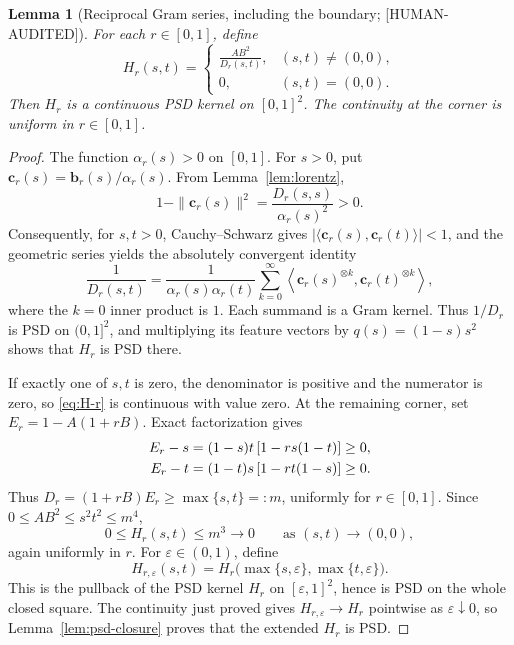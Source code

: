 \documentclass[11pt]{article}
\theoremstyle{plain}
\newtheorem{lemma}[theorem]{Lemma}
\theoremstyle{definition}
\theoremstyle{remark}
\newcommand{\status}[1]{\textnormal{\textsf{\footnotesize[#1]}}}
\newcommand{\HumanAudited}{\status{HUMAN-AUDITED}}
\begin{document}
\begin{lemma}[Reciprocal Gram series, including the boundary;
\HumanAudited]
\label{lem:reciprocal}
For each \(r\in[0,1]\), define
\begin{equation}
  H_r(s,t)=
  \begin{cases}
    \displaystyle\frac{AB^2}{D_r(s,t)},&(s,t)\ne(0,0),\\[6pt]
    0,&(s,t)=(0,0).
  \end{cases}
  \label{eq:H-r}
\end{equation}
Then \(H_r\) is a continuous PSD kernel on \([0,1]^2\).  The continuity at
the corner is uniform in \(r\in[0,1]\).
\end{lemma}

\begin{proof}
The function \(\alpha_r(s)>0\) on \([0,1]\).  For \(s>0\), put
\(\boldsymbol c_r(s)=\boldsymbol b_r(s)/\alpha_r(s)\).  From
Lemma~\ref{lem:lorentz},
\[
  1-\|\boldsymbol c_r(s)\|^2
  =\frac{D_r(s,s)}{\alpha_r(s)^2}>0.
\]
Consequently, for \(s,t>0\), Cauchy--Schwarz gives
\(|\langle\boldsymbol c_r(s),\boldsymbol c_r(t)\rangle|<1\), and the geometric
series yields the absolutely convergent identity
\begin{equation}
  \frac1{D_r(s,t)}
  =\frac1{\alpha_r(s)\alpha_r(t)}
   \sum_{k=0}^{\infty}
   \left\langle
     \boldsymbol c_r(s)^{\otimes k},
     \boldsymbol c_r(t)^{\otimes k}
   \right\rangle,
  \label{eq:reciprocal-series}
\end{equation}
where the \(k=0\) inner product is \(1\).  Each summand is a Gram kernel.
Thus \(1/D_r\) is PSD on \((0,1]^2\), and multiplying its feature vectors by
\(q(s)=(1-s)s^2\) shows that \(H_r\) is PSD there.

If exactly one of \(s,t\) is zero, the denominator is positive and the
numerator is zero, so \eqref{eq:H-r} is continuous with value zero.  At the
remaining corner, set \(E_r=1-A(1+rB)\).  Exact factorization gives
\begin{align}
  E_r-s&=(1-s)t\,[1-rs(1-t)]\ge0,\notag\\
  E_r-t&=(1-t)s\,[1-rt(1-s)]\ge0.
  \label{eq:corner-factors}
\end{align}
Thus \(D_r=(1+rB)E_r\ge\max\{s,t\}=:m\), uniformly for
\(r\in[0,1]\).  Since \(0\le AB^2\le s^2t^2\le m^4\),
\[
  0\le H_r(s,t)\le m^3\longrightarrow0
  \qquad\text{as }(s,t)\to(0,0),
\]
again uniformly in \(r\).  For \(\varepsilon\in(0,1)\), define
\[
H_{r,\varepsilon}(s,t)
=H_r\bigl(\max\{s,\varepsilon\},\max\{t,\varepsilon\}\bigr).
\]
This is the pullback of the PSD kernel \(H_r\) on
\([\varepsilon,1]^2\), hence is PSD on the whole closed square.  The continuity
just proved gives \(H_{r,\varepsilon}\to H_r\) pointwise as
\(\varepsilon\downarrow0\), so Lemma~\ref{lem:psd-closure} proves that the
extended \(H_r\) is PSD.
\end{proof}
\end{document}
